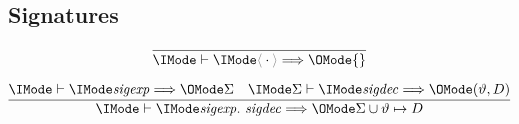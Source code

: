 \documentclass{article}
\begin{document}
\subsection*{Signatures\hfill \framebox{$\Elab{}{\SortSigExpr}{\Sigma}$}}

\begin{gather}
  \infer{
    \Elab{}{\EmptySig}{\{\}}
  }{
  }\\[6pt]
  \infer{
    \Elab{}{\ExtendSig{\SortSigExpr}{\SortSigDecl}}{\Sigma\cup\vartheta\mapsto D}
  }{
    \Elab{}{\SortSigExpr}{\Sigma} &
    \Elab{\Sigma}{\SortSigDecl}{(\vartheta, D)}
  }
\end{gather}
\end{document}
